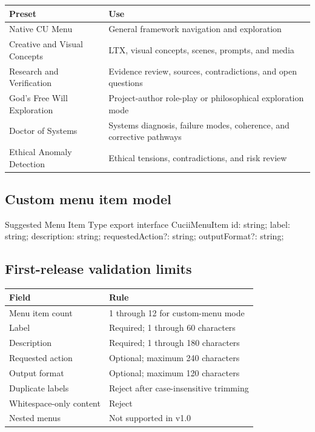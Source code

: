 \documentclass[11pt,letterpaper]{article}
\begin{document}
\begin{tabularx}{\textwidth}{L{2in}Y}
\toprule
\textbf{Preset} & \textbf{Use} \\
\midrule
Native CU Menu & General framework navigation and exploration \\
Creative and Visual Concepts & LTX, visual concepts, scenes, prompts, and media \\
Research and Verification & Evidence review, sources, contradictions, and open questions \\
God's Free Will Exploration & Project-author role-play or philosophical exploration mode \\
Doctor of Systems & Systems diagnosis, failure modes, coherence, and corrective pathways \\
Ethical Anomaly Detection & Ethical tensions, contradictions, and risk review \\
\bottomrule
\end{tabularx}

\subsection{Custom menu item model}

\begin{codebox}{Suggested Menu Item Type}
export interface CuciiMenuItem {
  id: string;
  label: string;
  description: string;
  requestedAction?: string;
  outputFormat?: string;
}
\end{codebox}

\subsection{First-release validation limits}

\begin{tabularx}{\textwidth}{L{2.15in}Y}
\toprule
\textbf{Field} & \textbf{Rule} \\
\midrule
Menu item count & 1 through 12 for custom-menu mode \\
Label & Required; 1 through 60 characters \\
Description & Required; 1 through 180 characters \\
Requested action & Optional; maximum 240 characters \\
Output format & Optional; maximum 120 characters \\
Duplicate labels & Reject after case-insensitive trimming \\
Whitespace-only content & Reject \\
Nested menus & Not supported in v1.0 \\
\bottomrule
\end{tabularx}
\end{document}
